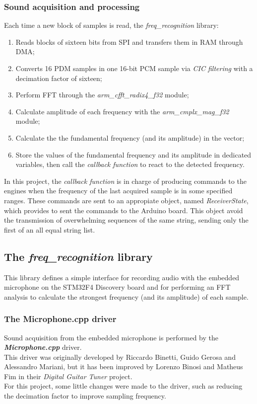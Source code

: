 \subsubsection{Sound acquisition and processing}
Each time a new block of samples is read, the \textit{freq\_recognition} library:
\begin{enumerate}
	\item Reads blocks of sixteen bits from SPI and transfers them in RAM through DMA;
	\item Converts 16 PDM samples in one 16-bit PCM sample via \textit{CIC filtering} with a decimation factor of sixteen;
	\item Perform FFT through the \textit{arm\_cfft\_radix4\_f32} module;
	\item Calculate amplitude of each frequency with the \textit{arm\_cmplx\_mag\_f32} module;
	\item Calculate the the fundamental frequency (and its amplitude) in the vector;
	\item Store the values of the fundamental frequency and its amplitude in dedicated variables, then call the \textit{callback function} to react to the detected frequency.
\end{enumerate}
In this project, the \textit{callback function} is in charge of producing commands to the engines when the frequency of the last acquired sample is in some specified ranges. These commands are sent to an appropiate object, named \textit{ReceiverState}, which provides to sent the commands to the Arduino board. This object avoid the transmission of overwhelming sequences of the same string, sending only the first of an all equal string list.


\subsection{The \textit{freq\_recognition} library}
This library defines a simple interface for recording audio with the embedded microphone on the STM32F4 Discovery board and for performing an FFT analysis to calculate the strongest frequency (and its amplitude) of each sample.

\subsubsection{The Microphone.cpp driver}
Sound acquisition from the embedded microphone is performed by the \textbf{\textit{Microphone.cpp}} driver. \\
This driver was originally developed by Riccardo Binetti, Guido Gerosa and Alessandro Mariani, but it has been improved by Lorenzo Binosi and Matheus Fim in their \textit{Digital Guitar Tuner} project. \\
For this project, some little changes were made to the driver, such as reducing the decimation factor to improve sampling frequency.

